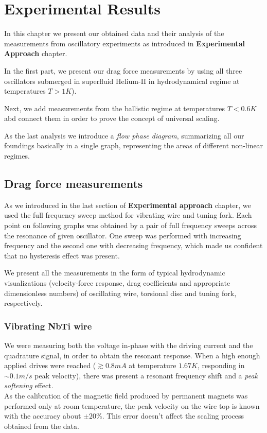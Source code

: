\chapter{Experimental Results}

In this chapter we present our obtained data and their analysis of the measurements from oscillatory experiments as introduced in \textbf{Experimental Approach} chapter.

In the first part, we present our drag force measurements by using all three oscillators submerged in superfluid Helium-II in hydrodynamical regime at temperatures $T > 1 \unit{K}$).

Next, we add measurements from the ballistic regime at temperatures $T < 0.6 \unit{K}$ abd connect them in order to prove the concept of universal scaling.

As the last analysis we introduce a \textit{flow phase diagram}, summarizing all our foundings basically in a single graph, representing the areas of different non-linear regimes.

\newpage

\section{Drag force measurements}

As we introduced in the last section of \textbf{Experimental approach} chapter, we used the full frequency sweep method for vibrating wire and tuning fork. Each point on following graphs was obtained by a pair of full frequency sweeps across the resonance of given oscillator. One sweep was performed with increasing frequency and the second one with decreasing frequency, which made us confident that no hysteresis effect was present.

We present all the measurements in the form of typical hydrodynamic visualizations (velocity-force response, drag coefficients and appropriate dimensionless numbers) of oscillating wire, torsional disc and tuning fork, respectively.

\subsection{Vibrating NbTi wire}

We were measuring both the voltage in-phase with the driving current and the quadrature signal, in order to obtain the resonant response. When a high enough applied drives were reached ($\gtrsim 0.8 \unit{mA}$ at temperature $1.67\unit{K}$, responding in $\sim 0.1 \unit{m/s}$ peak velocity), there was present a resonant frequency shift and a \textit{peak softening} effect.\\
As the calibration of the magnetic field produced by permanent magnets was performed only at room temperature, the peak velocity on the wire top is known with the accuracy about $\pm 20 \%$. This error doesn't affect the scaling process obtained from the data.

